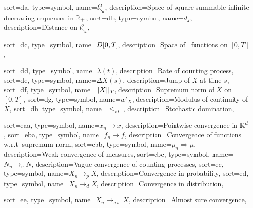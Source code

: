 {
	sort={da},
	type=symbol,
	name={$\mathit{l}^2_{\searrow}$},
	description={Space of square-summable infinite decreasing sequences in $\mathbb{R}_+$, \pageref{D: ld}}
}
{
	sort={db},
	type=symbol,
	name={$d_2$},
	description={Distance on $\mathit{l}^2_{\searrow}$, \pageref{D: ld}}
}

{
	sort={dc},
	type=symbol,
name={$D[0, T]$},
description={Space of \cadlag~functions on $[0,T]$, \pageref{D: DT}}
}

{
	sort={dd},
	type=symbol,
name={$\lambda(t)$},
description={Rate of counting process, \pageref{D: def gamma(A)}}
}
{
	sort={de},
	type=symbol,
name={$\Delta X(s)$},
description={Jump of $X$ at time $s$, \pageref{I: DeltaX}}
}
{
	sort={df},
	type=symbol,
name={$||X||_T$},
description={Supremum norm of $X$ on $[0,T]$, \pageref{I: supnorm}}
}
{
	sort={dg},
	type=symbol,
	name={$w'_X$},
	description={Modulus of continuity of $X$, \pageref{D: modulus of continuity}}
}
{
	sort={dh},
	type=symbol,
	name={$\leq_{s.t.}$},
	description={Stochastic domination, \pageref{E: stoch dom.}}
}


{
	sort={eaa},
	type=symbol,
	name={$x_n \rightarrow x$},
	description={Pointwise convergence in $\mathbb{R}^d$, \pageref{T: folk theorem}}
}
{
	sort={eba},
	type=symbol,
	name={$f_n \rightarrow f$},
	description={Convergence of functions w.r.t. supremum norm, \pageref{L: Deterministic Lemma}}
}
{
sort={ebb},
type=symbol,
name={$\mu_n \Rightarrow \mu$},
description={Weak convergence of measures, \pageref{D: weak convergence}}
}
{
sort={ebc},
type=symbol,
name={$N_n \rightarrow_v N$},
description={Vague convergence of counting processes, \pageref{D: vague convergence}}
}
{
	sort={ec},
	type=symbol,
	name={$X_n \rightarrow_p X$},
	description={Convergence in probability, \pageref{I: conv prob}}
}
{
	sort={ed},
	type=symbol,
	name={$X_n \rightarrow_d X$},
	description={Convergence in distribution, \pageref{D: weak convergence}}
}

{
	sort={ee},
	type=symbol,
	name={$X_n \rightarrow_{a.s.} X$},
	description={Almost sure convergence, \pageref{I: conv as}}
}
